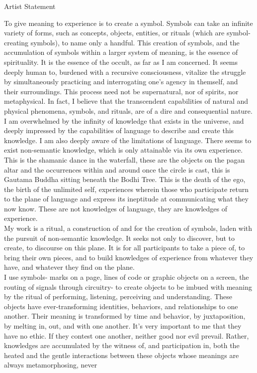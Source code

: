 \documentclass[11pt]{article}
\begin{document}
\vspace*{1\baselineskip}

\begingroup
\begin{center}
\huge Artist Statement
\end{center}
\endgroup

\vspace*{2\baselineskip}

\begingroup
\begin{center}
To give meaning to experience is to create a symbol. Symbols can take an infinite variety of forms, such as concepts, objects, entities, or rituals (which are symbol-creating symbols), to name only a handful. This creation of symbols, and the accumulation of symbols within a larger system of meaning, is the essence of spirituality. It is the essence of the occult, as far as I am concerned. It seems deeply human to, burdened with a recursive consciousness, vitalize the struggle by simultaneously practicing and interrogating one's agency in themself, and their surroundings. This process need not be supernatural, nor of spirits, nor metaphysical. In fact, I believe that the transcendent capabilities of natural and physical phenomena, symbols, and rituals, are of a dire and consequential nature. \\ I am overwhelmed by the infinity of knowledge that exists in the universe, and deeply impressed by the capabilities of language to describe and create this knowledge. I am also deeply aware of the limitations of language. There seems to exist non-semantic knowledge, which is only attainable via its own experience. This is the shamanic dance in the waterfall, these are the objects on the pagan altar and the occurrences within and around once the circle is cast, this is Gautama Buddha sitting beneath the Bodhi Tree. This is the death of the ego, the birth of the unlimited self, experiences wherein those who participate return to the plane of language and express its ineptitude at communicating what they now know. These are not knowledges of language, they are knowledges of experience. \\ My work is a ritual, a construction of and for the creation of symbols, laden with the pursuit of non-semantic knowledge. It seeks not only to discover, but to create, to discourse on this plane. It is for all participants to take a piece of, to bring their own pieces, and to build knowledges of experience from whatever they have, and whatever they find on the plane. \\ I use symbols- marks on a page, lines of code or graphic objects on a screen, the routing of signals through circuitry- to create objects to be imbued with meaning by the ritual of performing, listening, perceiving and understanding. These objects have ever-transforming identities, behaviors, and relationships to one another. Their meaning is transformed by time and behavior, by juxtaposition, by melting in, out, and with one another. It's very important to me that they have no ethic. If they contest one another, neither good nor evil prevail. Rather, knowledges are accumulated by the witness of, and participation in, both the heated and the gentle interactions between these objects whose meanings are always metamorphosing, never 
\end{center}
\end{document}
